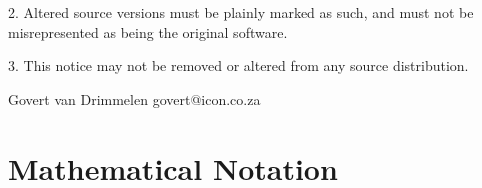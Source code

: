 2. Altered source versions must be plainly marked as such, and must not be
misrepresented as being the original software.

3. This notice may not be removed or altered from any source distribution.

\vparasmall
Govert van Drimmelen
govert@icon.co.za




%
%
%
%
%
%
%
%
%
%
%
%
%



\normalsize





\chapter{Mathematical Notation} 

%
%
%
%
%
%
%


